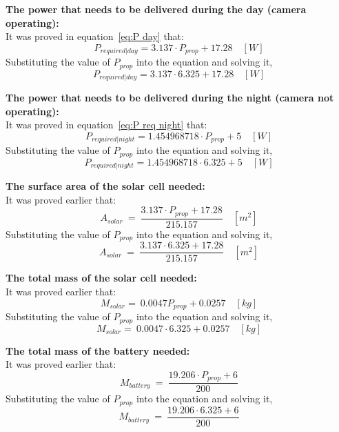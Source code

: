 \p \textbf{The power that needs to be delivered during the day (camera operating):} \vspace{0.1cm}\\
It was proved in equation~\ref{eq:P day} that:
\[ P_{required|day} = 3.137 \cdot P_{prop} + 17.28 \quad [W] \]
Substituting the value of $ P_{prop} $ into the equation and solving it,
\[ P_{required|day} = 3.137 \cdot 6.325 + 17.28 \quad [W] \]
\boxtwo

\vspace{1cm}

\p \textbf{The power that needs to be delivered during the night (camera not operating):} \vspace{0.1cm}\\
It was proved in equation~\ref{eq:P req night} that:
\[ P_{required | night} = 1.454968718 \cdot P_{prop} + 5 \quad [W] \]
Substituting the value of $ P_{prop} $ into the equation and solving it,
\[ P_{required | night} = 1.454968718 \cdot 6.325 + 5 \quad [W] \]
\boxthree

\vspace{1cm}

\p \textbf{The surface area of the solar cell needed:} \vspace{0.1cm}\\
It was proved earlier that:
\[ A_{solar} \ = \ \frac{ 3.137 \cdot P_{prop} + 17.28 }{ 215.157 } \quad [m^2] \]
Substituting the value of $ P_{prop} $ into the equation and solving it,
\[ A_{solar} \ = \ \frac{ 3.137 \cdot 6.325 + 17.28 }{ 215.157 } \quad [m^2] \]

\boxfour

\vspace{1cm}

\p \textbf{The total mass of the solar cell needed:} \vspace{0.1cm}\\
It was proved earlier that:
\[ M_{solar} = \ 0.0047 P_{prop} + 0.0257  \quad [kg] \]
Substituting the value of $ P_{prop} $ into the equation and solving it,
\[ M_{solar} = \ 0.0047 \cdot 6.325 + 0.0257  \quad [kg] \]
\boxfive

\vspace{1cm}
\p \textbf{The total mass of the battery needed:} \vspace{0.1cm}\\
It was proved earlier that:
\[ M_{battery} \ = \ \frac{ 19.206 \cdot P_{prop} + 6 }{ 200 } \]
Substituting the value of $ P_{prop} $ into the equation and solving it,
\[ M_{battery} \ = \ \frac{ 19.206 \cdot 6.325 + 6 }{ 200 } \]
\boxsix

\vspace{1cm}
